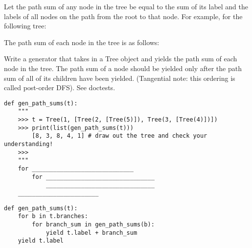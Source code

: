 \begin{blocksection}
\question Let the path sum of any node in the tree be equal to the sum of its label and the labels of all nodes on the path from the root to that node. For example, for the following tree:

The path sum of each node in the tree is as follows:


Write a generator that takes in a Tree object and yields the path sum of each node in the tree. The path sum of a node should be yielded only after the path sum of all of its children have been yielded. (Tangential note: this ordering is called post-order DFS). See doctests.


\begin{lstlisting}
def gen_path_sums(t):
    """
    >>> t = Tree(1, [Tree(2, [Tree(5)]), Tree(3, [Tree(4)])])
    >>> print(list(gen_path_sums(t)))
       	[8, 3, 8, 4, 1] # draw out the tree and check your understanding!
    >>> 
    """    
    for _____________________________
    	for _______________________________
    		_______________________________
    _______________________
\end{lstlisting}
\end{blocksection}

\begin{blocksection}
\begin{solution}[0.5in]
\begin{lstlisting}
def gen_path_sums(t):
    for b in t.branches:
        for branch_sum in gen_path_sums(b):
            yield t.label + branch_sum
    yield t.label
\end{lstlisting}

\end{solution}
\end{blocksection}
